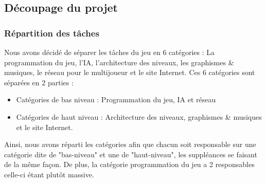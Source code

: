 \documentclass{article}
\begin{document}
\subsection{Découpage du projet}


\subsubsection{Répartition des tâches}

Nous avons décidé de séparer les tâches du jeu en 6 catégories : La programmation du jeu, l'IA, l'architecture des niveaux, les graphismes \& musiques, le réseau pour le multijoueur et le site Internet.
Ces 6 catégories sont séparées en 2 parties :

\begin{itemize}
    \item Catégories de bas niveau : Programmation du jeu, IA et réseau
    \item Catégories de haut niveau : Architecture des niveaux, graphismes \& musiques et le site Internet.
\end{itemize}

Ainsi, nous avons réparti les catégories afin que chacun soit responsable sur une catégorie dite de "bas-niveau" et une de "haut-niveau", les suppléances se faisant de la même façon. De plus, la catégorie programmation du jeu a 2 responsables celle-ci étant plutôt massive. \\
\end{document}
